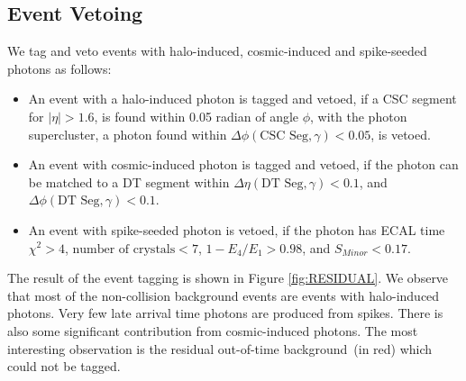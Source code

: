 \subsection{Event Vetoing}
We tag and veto events with halo-induced, cosmic-induced and spike-seeded photons as follows: 
\begin{itemize}
\item An event with a halo-induced photon is tagged and vetoed, if a CSC segment for $|\eta| > 1.6$, is found within 0.05 radian of angle $\phi$, with the photon supercluster, \ie a photon found within $\Delta\phi(\mbox{CSC Seg},\gamma) < 0.05$, is vetoed. 
\item An event with cosmic-induced photon is tagged and vetoed, if the photon can be matched to a DT segment within $\Delta\eta(\mbox{DT Seg},\gamma) < 0.1$, and $\Delta\phi(\mbox{DT Seg},\gamma) < 0.1$. %
\item An event with spike-seeded photon is vetoed, if the photon has ECAL time $\chi^{2} > 4$, $\mbox{number of crystals} < 7$, $ 1-E_{4}/E_{1} > 0.98$, and $S_{Minor} < 0.17$.%
\end{itemize}
\par 
The result of the event tagging is shown in Figure \ref{fig:RESIDUAL}. We observe that most of the non-collision background events are events with halo-induced photons. Very few late arrival time photons are produced from spikes. There is also some significant contribution from cosmic-induced photons. The most interesting observation is the residual out-of-time background~(in red) which could not be tagged. 

